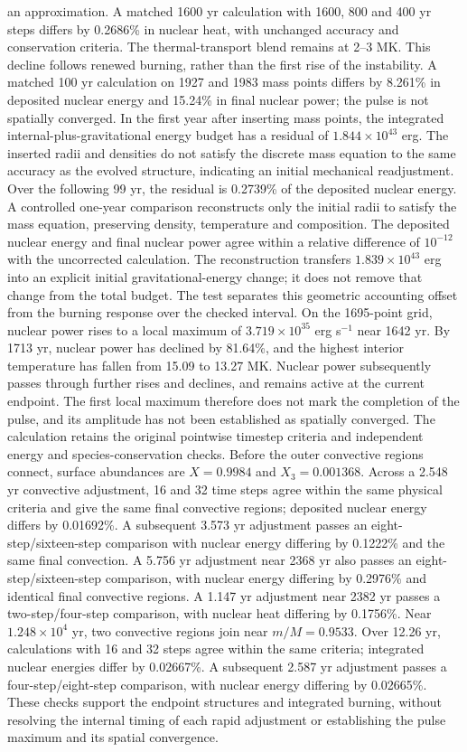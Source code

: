 \documentclass[11pt,letterpaper]{article}
\begin{document}
an approximation. A matched 1600 yr calculation with 1600, 800 and 400 yr
steps differs by 0.2686\% in nuclear heat, with unchanged accuracy and
conservation criteria. The thermal-transport blend remains at 2--3 MK.
This decline follows renewed burning, rather than the first rise of the
instability. A matched 100 yr calculation on 1927 and 1983 mass points
differs by 8.261\% in deposited nuclear energy and 15.24\% in final
nuclear power; the pulse is not spatially converged. In the first year
after inserting mass points, the integrated internal-plus-gravitational
energy budget has a residual of $1.844\times10^{43}$ erg. The inserted
radii and densities do not satisfy the discrete mass equation to the
same accuracy as the evolved structure, indicating an initial mechanical
readjustment. Over the following 99 yr, the residual is 0.2739\% of the
deposited nuclear energy. A controlled one-year comparison reconstructs
only the initial radii to satisfy the mass equation, preserving density,
temperature and composition. The deposited nuclear energy and final
nuclear power agree within a relative difference of $10^{-12}$ with the
uncorrected calculation. The reconstruction transfers
$1.839\times10^{43}$ erg into an explicit initial gravitational-energy
change; it does not remove that change from the total budget.
The test separates this geometric accounting offset from the burning
response over the checked interval.
On the 1695-point grid, nuclear power rises to a local maximum of $3.719\times10^{35}$ erg s$^{-1}$
near 1642 yr. By 1713 yr, nuclear power has declined by 81.64\%, and the
highest interior temperature has fallen from 15.09 to 13.27 MK. Nuclear power
subsequently passes through further rises and declines, and remains active
at the current endpoint.
The first local maximum therefore does not mark the completion of the pulse,
and its amplitude has not been established as spatially converged.
The calculation retains the original pointwise timestep criteria and independent
energy and species-conservation checks. Before the outer convective regions
connect, surface abundances are $X=0.9984$ and $X_3=0.001368$.
Across a 2.548 yr convective adjustment, 16 and 32 time steps
agree within the same physical criteria and give the same final convective
regions; deposited nuclear energy differs by 0.01692\%. A subsequent
3.573 yr adjustment passes an eight-step/sixteen-step comparison with
nuclear energy differing by 0.1222\% and the same final convection.
A 5.756 yr adjustment near 2368 yr also passes an eight-step/sixteen-step
comparison, with nuclear energy differing by 0.2976\% and identical final
convective regions. A 1.147 yr adjustment near 2382 yr passes a two-step/four-step
comparison, with nuclear heat differing by 0.1756\%.
Near $1.248\times10^4$ yr, two convective regions join near $m/M=0.9533$.
Over 12.26 yr, calculations with 16 and 32 steps agree within the same
criteria; integrated nuclear energies differ by 0.02667\%. A subsequent
2.587 yr adjustment passes a four-step/eight-step comparison, with nuclear
energy differing by 0.02665\%. These checks support the
endpoint structures and integrated burning,
without resolving the internal timing of each rapid adjustment or
establishing the pulse maximum and its spatial convergence.
\end{document}
